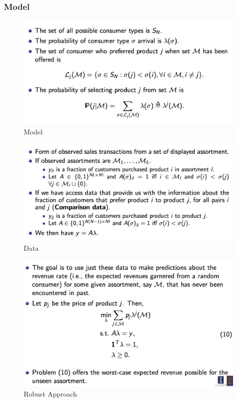 \documentclass[11pt,a4paper]{article}
\begin{document}
\subsubsection{ Model}
\begin{center}\begin{figure}[htbp]
    \centering
    \includegraphics[scale=0.5]{RLCM2.png}
    \caption{Model}
    \label{}
\end{figure}\end{center}
\begin{center}\begin{figure}[htbp]
    \centering
    \includegraphics[scale=0.5]{RLCM3.png}
    \caption{Data}
    \label{}
\end{figure}\end{center}
\begin{center}\begin{figure}[htbp]
    \centering
    \includegraphics[scale=0.5]{RLCM4.png}
    \caption{Robust Approach}
    \label{}
\end{figure}\end{center}
\end{document}
